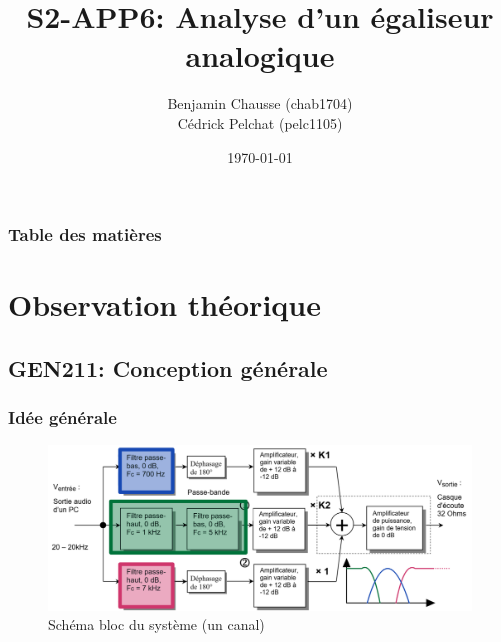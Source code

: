 \documentclass[10pt]{beamer}\usepackage[]{graphicx}\usepackage[]{xcolor}
\title[S2-APP6: Analyse d'EQ analogique]{S2-APP6: Analyse d'un égaliseur analogique}
\author[Benjamin Chausse \& Cédrick Pelchat]{
  Benjamin Chausse (chab1704)\\
  Cédrick Pelchat (pelc1105)
}
\institute[UDS]{Université de Sherbrooke}
\date{\today}
\begin{document}
\maketitle

\begin{frame}
  \frametitle{Table des matières}
  \tableofcontents
\end{frame}












\section{Observation théorique}
\subsection{GEN211: Conception générale}


\begin{frame}
  \frametitle{Idée générale}
  \begin{figure}
    \centering
    \includegraphics[width=\textwidth]{figure/schema-bloc.png}
    \caption{Schéma bloc du système (un canal)}
  \end{figure}
\end{frame}
\end{document}
